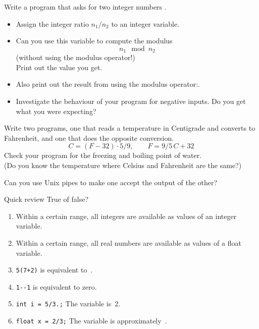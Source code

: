 \begin{exercise}
  \label{ex:modulus}
  Write a program that asks for two integer numbers .
  \begin{itemize}
  \item Assign the integer ratio $n_1/n_2$ to an integer variable.
  \item Can you use this variable to compute the modulus
    \[ n_1\mod n_2 \]
    (without using the  modulus operator!)\\
    Print out the value you get.
  \item Also print out the result from using the modulus
    operator:.
  \item Investigate the behaviour of your program for negative
    inputs. Do you get what you were expecting?
  \end{itemize}
\end{exercise}

\begin{exercise}
  \label{ex:C2F}
  Write two programs, one that reads a temperature in Centigrade and
  converts to Fahrenheit, and one that does the opposite conversion.
  \[ C = (F-32)\cdot 5/9,\qquad F = 9/5\,C+32 \]
  Check your program for the freezing and boiling point of water.\\
  (Do you know the temperature where Celsius and Fahrenheit are the
  same?)
  
  Can you use Unix pipes to make one accept the output of the other?
\end{exercise}

\begin{exercise}{Quick review}
  \label{q:vartypes}
  True of false?
  \begin{enumerate}
  \item Within a certain range, all integers are available as values of an
    integer variable.
  \item Within a certain range, all real numbers are available as values of a
    float variable.
  \item \verb-5(7+2)- is equivalent to~.
  \item \verb+1--1+ is equivalent to zero.
  \item \verb-int i = 5/3.;- The variable  is~2.
  \item \verb-float x = 2/3;- The variable  is approximately~.
  \end{enumerate}
\end{exercise}

